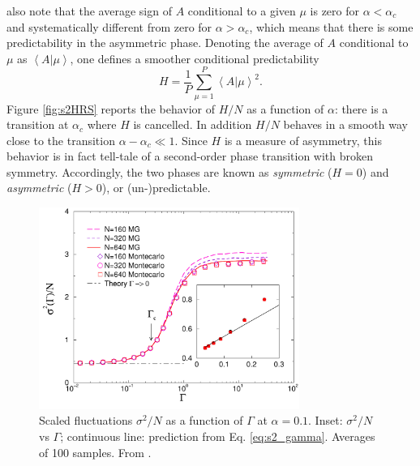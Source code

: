\documentclass[aps,twocolumn,nofootinbib,sortedaddress,reprint]{revtex4-1}
\begin{document}
\textcite{Savit} also note that the average sign of $A$ conditional to
a given $\mu$ is zero for $\alpha<\alpha_c$ and systematically
different from zero for $\alpha>\alpha_c$, which means that there is some predictability in the asymmetric phase.
 Denoting the average of $A$
conditional to $\mu$ as $\left<A|\mu\right>$, one defines a smoother conditional predictability
\begin{equation}\label{eq:H_def}
H=\frac{1}{P}\sum_{\mu=1}^P\left<A|\mu\right>^2.
\end{equation}
 Figure \ref{fig:s2HRS}
reports the behavior of $H/N$ as a function of $\alpha$: there is a
transition at $\alpha_c$ where $H$ is cancelled. In addition $H/N$ behaves in a smooth way close to the transition $\alpha-\alpha_c\ll1$. Since $H$ is a
measure of asymmetry, this behavior is in fact tell-tale of a  second-order phase
transition with broken symmetry. Accordingly, the two phases are known
as {\em symmetric }($H=0$) and {\em asymmetric} ($H>0$), or
(un-)predictable.
\begin{figure}
\includegraphics*[width=8.5cm]{fig2.pdf}
\caption{\label{fig:s2gamma} Scaled fluctuations $\sigma^2/N$ as a
  function of $\Gamma$ at $\alpha=0.1$. Inset: $\sigma^2/N$ vs $\Gamma$; continuous line: prediction from Eq. \eqref{eq:s2_gamma}. Averages of 100 samples.
  From \textcite{MC01}.}
\end{figure}
\end{document}
